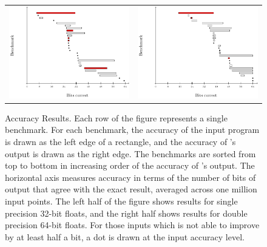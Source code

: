 \documentclass[paper.tex]{subfiles}
\begin{document}
\begin{figure}
  \begin{tabular}{cc}
    \includegraphics[width=0.9\columnwidth]{fig/eval-rect-f.pdf}
    &
    \includegraphics[width=0.9\columnwidth]{fig/eval-rect-d.pdf}
  \end{tabular}
  \caption{Accuracy Results. Each row of the figure represents a
    single benchmark. For each benchmark, the accuracy of the input
    program is drawn as the left edge of a rectangle, and the accuracy
    of \casio's output is drawn as the right edge.  The benchmarks are
    sorted from top to bottom in increasing order of the accuracy of
    \casio's output. The horizontal axis measures accuracy in terms of
    the number of bits of output that agree with the exact result,
    averaged across one million input points. The left half of the
    figure shows results for single precision 32-bit floats, and the
    right half shows results for double precision 64-bit floats. For
    those inputs which \casio is not able to improve by at least half
    a bit, a dot is drawn at the input accuracy level. }
  \label{fig:eval-rect}
\end{figure}
\end{document}
